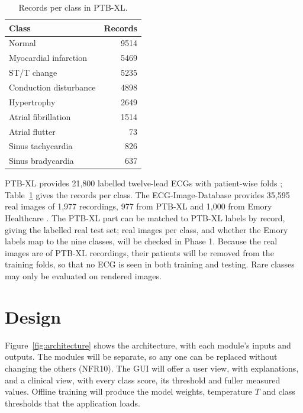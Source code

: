 \begin{table}[H]
  \centering
  \footnotesize
  \begin{minipage}[t]{0.40\linewidth}
    \vspace{0pt}
    \centering
    \caption{Records per class in PTB-XL.}
    \label{tab:class-counts}
    \begin{tabular}{@{}lr@{}}
      \toprule
      \textbf{Class} & \textbf{Records} \\
      \midrule
      Normal & 9514 \\
      Myocardial infarction & 5469 \\
      ST/T change & 5235 \\
      Conduction disturbance & 4898 \\
      Hypertrophy & 2649 \\
      Atrial fibrillation & 1514 \\
      Atrial flutter & 73 \\
      Sinus tachycardia & 826 \\
      Sinus bradycardia & 637 \\
      \bottomrule
    \end{tabular}
  \end{minipage}\hfill
  \begin{minipage}[t]{0.55\linewidth}
    \vspace{0pt}
    \normalsize
    PTB-XL provides 21,800 labelled twelve-lead ECGs with patient-wise folds \cite{wagner_ptbxl_2020}; Table~\ref{tab:class-counts} gives the records per class. The ECG-Image-Database provides 35,595 real images of 1,977 recordings, 977 from PTB-XL and 1,000 from Emory Healthcare \cite{reyna_ecg-image-database_2024}. The PTB-XL part can be matched to PTB-XL labels by record, giving the labelled real test set; real images per class, and whether the Emory labels map to the nine classes, will be checked in Phase 1. Because the real images are of PTB-XL recordings, their patients will be removed from the training folds, so that no ECG is seen in both training and testing. Rare classes may only be evaluated on rendered images.
  \end{minipage}
\end{table}

\section{Design}
\label{sec:design}

Figure~\ref{fig:architecture} shows the architecture, with each module's inputs and outputs. The modules will be separate, so any one can be replaced without changing the others (NFR10). The GUI will offer a user view, with explanations, and a clinical view, with every class score, its threshold and fuller measured values. Offline training will produce the model weights, temperature $T$ and class thresholds that the application loads.

